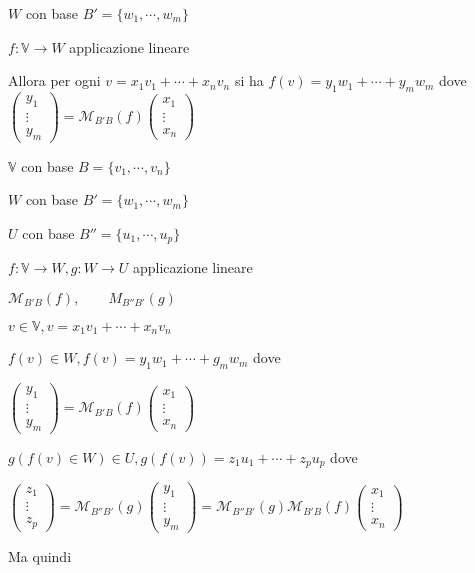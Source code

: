 \documentclass{article}
\newcommand{\V}{\mathbb{V}}
\newcommand{\M}{\mathcal{M}}
\begin{document}
$W$ con base $B'=\{w_1,\cdots,w_m\}$

$f:\V\rightarrow W$ applicazione lineare

	Allora per ogni $v=x_1v_1+\cdots+x_nv_n$ si ha $f(v)=y_1w_1+\cdots+y_mw_m$ dove $\begin{pmatrix}y_1\\\vdots\\y_m\end{pmatrix}=\M_{B'B}(f)\begin{pmatrix}x_1\\\vdots\\x_n\end{pmatrix}$



$\V$ con base $B=\{v_1,\cdots,v_n\}$

$W$ con base $B'=\{w_1,\cdots,w_m\}$

$U$ con base $B''=\{u_1,\cdots,u_p\}$

$f:\V\rightarrow W, g:W\rightarrow U$ applicazione lineare

$\M_{B'B}(f),\qquad M_{B''B'}(g)$

$v\in\V,v=x_1v_1+\cdots+x_nv_n$

$f(v)\in W, f(v)=y_1w_1+\cdots+g_mw_m$ dove

$\begin{pmatrix}y_1\\\vdots\\y_m\end{pmatrix}=\M_{B'B}(f)\begin{pmatrix}x_1\\\vdots\\x_n\end{pmatrix}$

$g(f(v)\in W)\in U, g(f(v))=z_1u_1+\cdots+z_pu_p$ dove

$\begin{pmatrix}z_1\\\vdots\\z_p\end{pmatrix}=\M_{B''B'}(g)\begin{pmatrix}y_1\\\vdots\\y_m\end{pmatrix}=\M_{B''B'}(g)\M_{B'B}(f)\begin{pmatrix}x_1\\\vdots\\x_n\end{pmatrix}$

	Ma quindi
\end{document}
